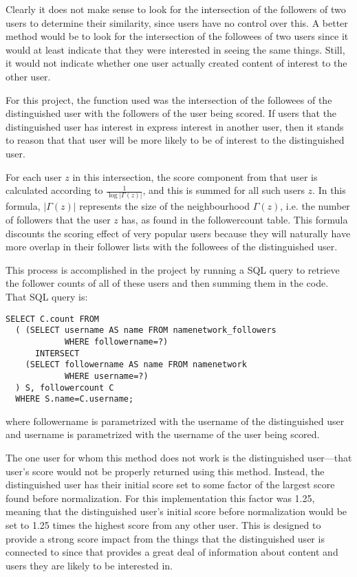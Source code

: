 Clearly it does not make sense to look for the intersection of the followers of two users to determine their similarity, since users have no control over this. A better method would be to look for the intersection of the followees of two users since it would at least indicate that they were interested in seeing the same things. Still, it would not indicate whether one user actually created content of interest to the other user.

For this project, the function used was the intersection of the followees of the distinguished user with the followers of the user being scored. If users that the distinguished user has interest in express interest in another user, then it stands to reason that that user will be more likely to be of interest to the distinguished user.

For each user $z$ in this intersection, the score component from that user is calculated according to $\frac{1}{\log |\Gamma (z) |}$, and this is summed for all such users $z$. In this formula, $|\Gamma (z)|$ represents the size of the neighbourhood $\Gamma (z)$, i.e. the number of followers that the user $z$ has, as found in the followercount table. This formula discounts the scoring effect of very popular users because they will naturally have more overlap in their follower lists with the followees of the distinguished user.


This process is accomplished in the project by running a SQL query to retrieve the follower counts of all of these users and then summing them in the code. That SQL query is:

\begin{verbatim}
SELECT C.count FROM
  ( (SELECT username AS name FROM namenetwork_followers
            WHERE followername=?)
      INTERSECT
    (SELECT followername AS name FROM namenetwork
            WHERE username=?)
  ) S, followercount C
  WHERE S.name=C.username;
\end{verbatim}

\noindent
where followername is parametrized with the username of the distinguished user and username is parametrized with the username of the user being scored.

The one user for whom this method does not work is the distinguished user---that user's score would not be properly returned using this method. Instead, the distinguished user has their initial score set to some factor of the largest score found before normalization. For this implementation this factor was 1.25, meaning that the distinguished user's initial score before normalization would be set to 1.25 times the highest score from any other user. This is designed to provide a strong score impact from the things that the distinguished user is connected to since that provides a great deal of information about content and users they are likely to be interested in.


